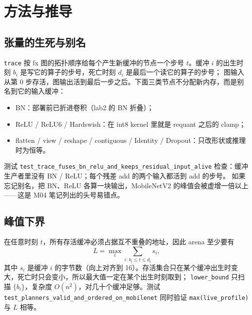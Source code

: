 \documentclass[11pt,a4paper]{ctexart}
\begin{document}
\section{方法与推导}\label{sec:method}

\subsection{张量的生死与别名}
\texttt{trace} 按 fx 图的拓扑顺序给每个产生新缓冲的节点一个步号 $t$。缓冲 $i$ 的出生时刻 $b_i$ 是写它的算子的步号，死亡时刻 $d_i$ 是最后一个读它的算子的步号；
图输入从第 0 步存活，图输出活到最后一步之后。下面三类节点不分配新内存，而是别名到它的输入缓冲：
\begin{itemize}
  \item BN：部署前已折进卷积（lab2 的 BN 折叠）；
  \item ReLU / ReLU6 / Hardswish：在 int8 kernel 里就是 requant 之后的 clamp；
  \item flatten / view / reshape / contiguous / Identity / Dropout：只改形状或推理时为恒等。
\end{itemize}
测试 \texttt{test\_trace\_fuses\_bn\_relu\_and\_keeps\_residual\_input\_alive} 检查：缓冲生产者里没有 BN / ReLU；每个残差 add 的两个输入都活到 add 的步号。
如果忘记别名，把 BN、ReLU 各算一块输出，MobileNetV2 的峰值会被虚增一倍以上——这是 M04 笔记列出的头号易错点。

\subsection{峰值下界}
在任意时刻 $t$，所有存活缓冲必须占据互不重叠的地址，因此 arena 至少要有
\begin{equation}
  L = \max_t \sum_{i:\, b_i \le t \le d_i} s_i , \label{eq:e10}
\end{equation}
其中 $s_i$ 是缓冲 $i$ 的字节数（向上对齐到 16）。存活集合只在某个缓冲出生时变大，死亡时只会变小，所以最大值一定在某个出生时刻取到；
\texttt{lower\_bound} 只扫描 $\{b_i\}$，复杂度 $O(n^2)$，对几十个缓冲足够。测试 \texttt{test\_planners\_valid\_and\_ordered\_on\_mobilenet} 同时验证 \texttt{max(live\_profile)} 与 $L$ 相等。
\end{document}

